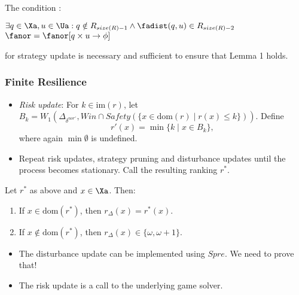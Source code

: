 \begin{itemize}
\begin{lemma}
The condition :

		$\exists q \in \Xa, u \in \Ua: q \notin R_{size(R)-1} \wedge \fadist(q,u) \in R_{size(R)-2}$ \\
		$\fanor = \fanor [q \times u \rightarrow \phi]$
		

for strategy update is necessary and sufficient to ensure that Lemma 1 holds.
\end{lemma}


\end{itemize} 



\subsubsection{Finite Resilience}
\begin{itemize}	
	\item \emph{Risk update}:
	For $k \in \mathrm{im}(r)$, let $B_k = W_1(\Delta_{\delta^{nor'}}, \mathit{Win} \cap \mathit{Safety}( \{x \in \mathrm{dom}(r) \mid r(x) \leq k \}))$.
	Define
	\[ r'(x) = \min{\{ k \mid x \in B_k \}}, \]
	where again $\min{\emptyset}$ is undefined.
	\item Repeat risk updates, strategy pruning and disturbance updates until the process becomes stationary.
	Call the resulting ranking $r^\ast$.

\end{itemize}

\begin{lemma}
Let $r^\ast$ as above and $x \in \Xa$.
Then:
\begin{enumerate}
	\item If $x \in \mathrm{dom}(r^\ast)$, then $r_\Delta(x) = r^\ast(x)$.
	\item If $x \notin \mathrm{dom}(r^\ast)$, then $r_\Delta(x) \in \{ \omega, \omega+1\}$.
\end{enumerate}
\end{lemma}

\begin{itemize}
	\item The disturbance update can be implemented using $\mathit{Spre}$.
	We need to prove that!
	\item The risk update is a call to the underlying game solver.
\end{itemize}


